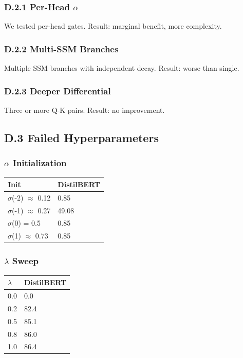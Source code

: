 \subsubsection{D.2.1 Per-Head $\alpha$}

We tested per-head gates. Result: marginal benefit, more complexity.

\subsubsection{D.2.2 Multi-SSM Branches}

Multiple SSM branches with independent decay. Result: worse than single.

\subsubsection{D.2.3 Deeper Differential}

Three or more Q-K pairs. Result: no improvement.

\subsection{D.3 Failed Hyperparameters}

\subsubsection{$\alpha$ Initialization}

\begin{table}[H]
\centering
\small
\begin{tabular}{ll}
\toprule
\textbf{Init} & \textbf{DistilBERT} \\
\midrule
$\sigma$(-2) $\approx$ 0.12 & 0.85 \\
$\sigma$(-1) $\approx$ 0.27 & 49.08 \\
$\sigma$(0) = 0.5 & 0.85 \\
$\sigma$(1) $\approx$ 0.73 & 0.85 \\
\bottomrule
\end{tabular}
\end{table}

\subsubsection{$\lambda$ Sweep}

\begin{table}[H]
\centering
\small
\begin{tabular}{ll}
\toprule
\textbf{$\lambda$} & \textbf{DistilBERT} \\
\midrule
0.0 & 0.0 \\
0.2 & 82.4 \\
0.5 & 85.1 \\
0.8 & 86.0 \\
1.0 & 86.4 \\
\bottomrule
\end{tabular}
\end{table}

